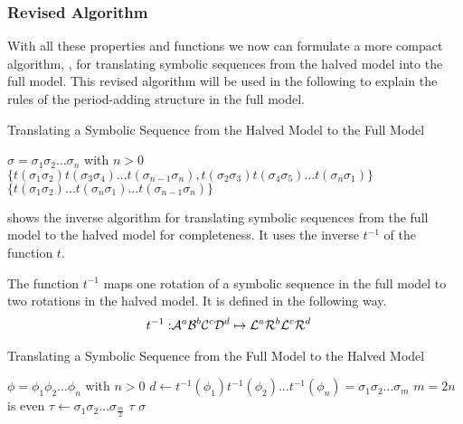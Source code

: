 \subsubsection{Revised Algorithm}

With all these properties and functions we now can formulate a more compact algorithm, , for translating symbolic sequences from the halved model into the full model.
This revised algorithm will be used in the following to explain the rules of the period-adding structure in the full model.

\begin{algorithm}
    \caption{Translating a Symbolic Sequence from the Halved Model to the Full Model}\label{alg:halved.to.full}
    \begin{algorithmic}
        \Require $\sigma = \sigma_1\sigma_2 \dots \sigma_n$ with $n > 0$
        \State \Return $\{t(\sigma_1\sigma_2) t(\sigma_3\sigma_4) \dots t(\sigma_{n-1}\sigma_n), t(\sigma_2\sigma_3) t(\sigma_4\sigma_5) \dots t(\sigma_n\sigma_1)\}$
        \State \Return $\{t(\sigma_1\sigma_2) \dots t(\sigma_{n}\sigma_1) \dots t(\sigma_{n-1}\sigma_n)\}$
        \EndIf
    \end{algorithmic}
\end{algorithm}

 shows the inverse algorithm for translating symbolic sequences from the full model to the halved model for completeness.
It uses the inverse $t^{-1}$ of the function $t$.

\begin{definition}
    The function $t^{-1}$ maps one rotation of a symbolic sequence in the full model to two rotations in the halved model.
    It is defined in the following way.
    \begin{align}
        t^{-1}: & \mathcal{A}^a\mathcal{B}^b\mathcal{C}^c\mathcal{D}^d \mapsto \mathcal{L}^a\mathcal{R}^b\mathcal{L}^c\mathcal{R}^d
    \end{align}
\end{definition}

\begin{algorithm}
    \caption{Translating a Symbolic Sequence from the Full Model to the Halved Model}\label{alg:full.to.halved}
    \begin{algorithmic}
        \Require $\phi = \phi_1\phi_2 \dots \phi_n$ with $n > 0$
        \State $d \gets t^{-1}(\phi_1)t^{-1}(\phi_2) \dots t^{-1}(\phi_n) = \sigma_1\sigma_2 \dots \sigma_m$
        \Comment $m = 2n$ is even
        \State $\tau \gets \sigma_1\sigma_2 \dots \sigma_{\frac{m}{2}}$
        \State \Return $\tau$
        \State \Return $\sigma$
        \EndIf
    \end{algorithmic}
\end{algorithm}
